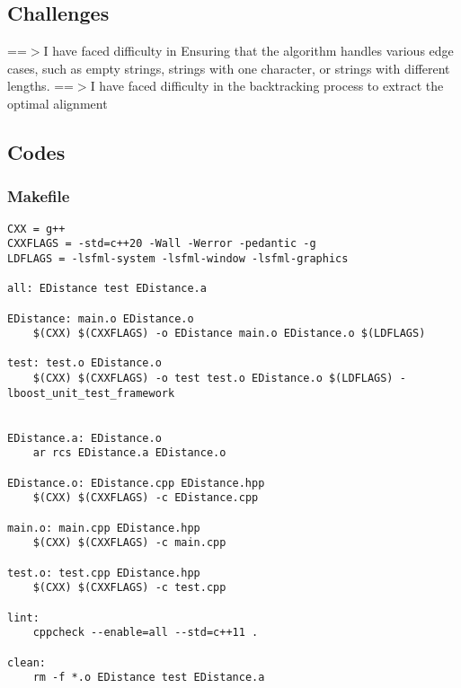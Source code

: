 \documentclass[12pt]{article}
\begin{document}
\subsection{Challenges}
==$>$I have faced difficulty in Ensuring that the algorithm handles various edge cases, such as empty strings, strings with one character, or strings with different lengths.
\newline
==$>$I have faced difficulty in the backtracking process to extract the optimal alignment
\subsection{Codes}
\subsubsection{Makefile}
\begin{lstlisting}[style=cppcode]
CXX = g++
CXXFLAGS = -std=c++20 -Wall -Werror -pedantic -g
LDFLAGS = -lsfml-system -lsfml-window -lsfml-graphics

all: EDistance test EDistance.a

EDistance: main.o EDistance.o
	$(CXX) $(CXXFLAGS) -o EDistance main.o EDistance.o $(LDFLAGS)

test: test.o EDistance.o
	$(CXX) $(CXXFLAGS) -o test test.o EDistance.o $(LDFLAGS) -lboost_unit_test_framework


EDistance.a: EDistance.o
	ar rcs EDistance.a EDistance.o

EDistance.o: EDistance.cpp EDistance.hpp
	$(CXX) $(CXXFLAGS) -c EDistance.cpp

main.o: main.cpp EDistance.hpp
	$(CXX) $(CXXFLAGS) -c main.cpp

test.o: test.cpp EDistance.hpp
	$(CXX) $(CXXFLAGS) -c test.cpp

lint:
	cppcheck --enable=all --std=c++11 .

clean:
	rm -f *.o EDistance test EDistance.a
\end{lstlisting}
\end{document}
